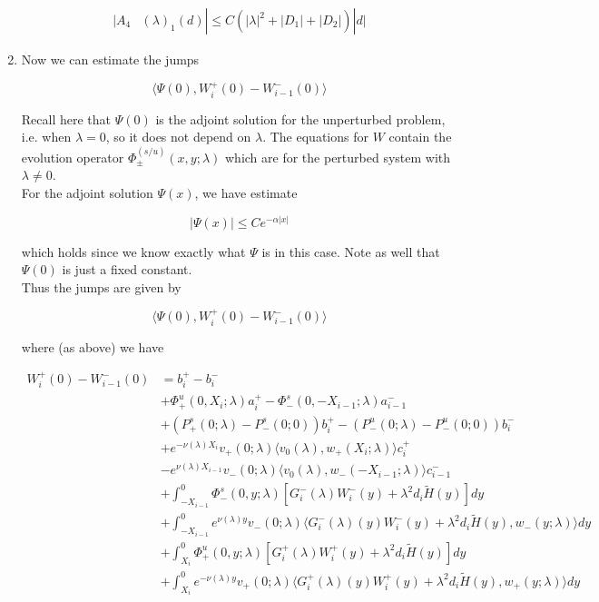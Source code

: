 \documentclass[12pt]{article}
\begin{document}
\begin{enumerate}
\begin{align*}
|A_4&(\lambda)_1(d)| \leq C(|\lambda|^2 + |D_1| + |D_2| )|d|
\end{align*}

\item Now we can estimate the jumps

\[
\langle \Psi(0), W_i^+(0) - W_{i-1}^-(0) \rangle 
\]

Recall here that $\Psi(0)$ is the adjoint solution for the unperturbed problem, i.e. when $\lambda = 0$, so it does not depend on $\lambda$. The equations for $W$ contain the evolution operator $\Phi^{(s/u)}_\pm(x, y; \lambda)$ which are for the perturbed system with $\lambda \neq 0$.\\

For the adjoint solution $\Psi(x)$, we have estimate 

\[
|\Psi(x)| \leq C e^{-\alpha|x|}
\]

which holds since we know exactly what $\Psi$ is in this case. Note as well that $\Psi(0)$ is just a fixed constant.\\

Thus the jumps are given by

\[
\langle \Psi(0), W_i^+(0) - W_{i-1}^-(0) \rangle 
\]

where (as above) we have

\begin{align*}
W_i^+(0) - W_{i-1}^-(0) &= b_i^+ - b_i^- \\
&+ \Phi^u_+(0, X_i; \lambda)a_i^+ - \Phi^s_-(0, -X_{i-1}; \lambda)a_{i-1}^- \\
&+(P^s_+(0; \lambda) - P^s_-(0; 0))b_i^+  - (P^u_-(0; \lambda) - P^u_-(0; 0))b_i^- \\
&+ e^{-\nu(\lambda)X_i} v_+(0; \lambda) \langle v_0(\lambda), w_+(X_i; \lambda) \rangle c_i^+ \\
&- e^{\nu(\lambda)X_{i-1}} v_-(0; \lambda) \langle v_0(\lambda), w_-(-X_{i-1}; \lambda) \rangle c_{i-1}^- \\
&+ \int_{-X_{i-1}}^0 \Phi^s_-(0, y; \lambda) [ G_i^-(\lambda)W_i^-(y) + \lambda^2 d_i \tilde{H}(y) ] dy \\
&+ \int_{-X_{i-1}}^0
e^{\nu(\lambda)y} v_-(0; \lambda) \langle G_i^-(\lambda)(y)W_i^-(y) + \lambda^2 d_i \tilde{H}(y), w_-(y; \lambda) \rangle dy \\
&+ \int_{X_i}^0 \Phi^u_+(0, y; \lambda) [ G_i^+(\lambda)W_i^+(y) + \lambda^2 d_i \tilde{H}(y) ] dy \\
&+ \int_{X_i}^0 e^{-\nu(\lambda)y} v_+(0; \lambda) \langle G_i^+(\lambda)(y)W_i^+(y) + \lambda^2 d_i \tilde{H}(y), w_+(y; \lambda) \rangle dy
\end{align*}


\end{enumerate}
\end{document}
